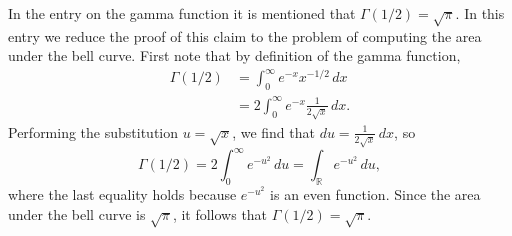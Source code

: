 \documentclass[12pt]{article}
\begin{document}
In the entry on the gamma function it is mentioned that $\Gamma(1/2) =
\sqrt{\pi}$.  In this entry we reduce the proof of this claim to the
problem of computing the area under the bell curve.  First note that by
definition of the gamma function,
\begin{align*}
\Gamma(1/2) 
&= \int_0^{\infty} e^{-x} x^{-1/2}\,dx \\
&=  2\int_0^{\infty} e^{-x} \frac{1}{2\sqrt{x}}\,dx.
\end{align*}
Performing the substitution $u = \sqrt{x}$, we find that $du =
\frac{1}{2\sqrt{x}}\,dx$, so
\[
\Gamma(1/2) = 2\int_0^{\infty} e^{-u^2}\,du = \int_{\mathbb{R}} e^{-u^2}\,du,
\]
where the last equality holds because $e^{-u^2}$ is an even function.
Since the area under the bell curve is $\sqrt{\pi}$, it follows that
$\Gamma(1/2) = \sqrt{\pi}$.

\end{document}

